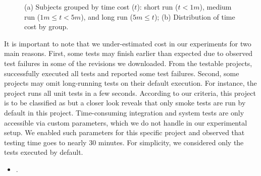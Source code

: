 \begin{figure}[ht]
\begin{subfigure}{0.25\textwidth}
        \caption{\label{fig:rq1-boxplot}}
    \end{subfigure}%
    \caption{(a) Subjects grouped by time cost ($t$): short run ($t <
    1m$), medium run ($1m \le t < 5m$), and long run ($5m \le t$); (b)
    Distribution of time cost by group.}
\end{figure}


It is important to note that we under-estimated cost in our
experiments for two main reasons.  First, some tests may finish
earlier than expected due to observed test failures in some of the
revisions we downloaded.  From the \numSubjs{} testable projects,
\numSubjsPass{} successfully executed all tests and \numSubjsFail{}
reported some test failures.  Second, some projects may omit
long-running tests on their default execution. For instance, the
project  runs all unit tests in a few
seconds.  According to our criteria, this project is to be classified
as \shortg{} but a closer look reveals that only smoke tests are run
by default in this project.  Time-consuming integration and system
tests are only accessible via custom parameters, which we do not
handle in our experimental setup.  We enabled such parameters for this
specific project and observed that testing time goes to nearly 30
minutes.  For simplicity, we considered only the tests executed by
default.

\begin{center}
\end{center}


\vspace{1ex}
\begin{itemize}
    \item \numRQB. \textbf{\RQB}
\end{itemize}

